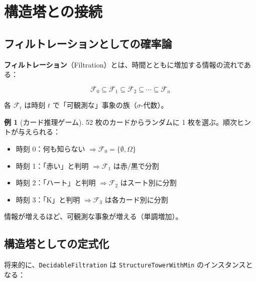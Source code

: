 \documentclass[12pt,a4paper,ja=standard]{bxjsarticle}
\theoremstyle{definition}
\newtheorem{example}[definition]{例}
\begin{document}
\section{構造塔との接続}\label{sec:structure-tower}

\subsection{フィルトレーションとしての確率論}

\textbf{フィルトレーション}（Filtration）とは、時間とともに増加する情報の流れである：

\[
\mathcal{F}_0 \subseteq \mathcal{F}_1 \subseteq \mathcal{F}_2 \subseteq \cdots \subseteq \mathcal{F}_n
\]

各 $\mathcal{F}_t$ は時刻 $t$ で「可観測な」事象の族（$\sigma$-代数）。

\begin{example}[カード推理ゲーム]
52 枚のカードからランダムに 1 枚を選ぶ。順次ヒントが与えられる：

\begin{itemize}
    \item 時刻 0：何も知らない $\Rightarrow \mathcal{F}_0 = \{\emptyset, \Omega\}$
    \item 時刻 1：「赤い」と判明 $\Rightarrow \mathcal{F}_1$ は赤/黒で分割
    \item 時刻 2：「ハート」と判明 $\Rightarrow \mathcal{F}_2$ はスート別に分割
    \item 時刻 3：「K」と判明 $\Rightarrow \mathcal{F}_3$ は各カード別に分割
\end{itemize}

情報が増えるほど、可観測な事象が増える（単調増加）。
\end{example}

\subsection{構造塔としての定式化}

将来的に、\texttt{DecidableFiltration} は \texttt{StructureTowerWithMin} のインスタンスとなる：
\end{document}
